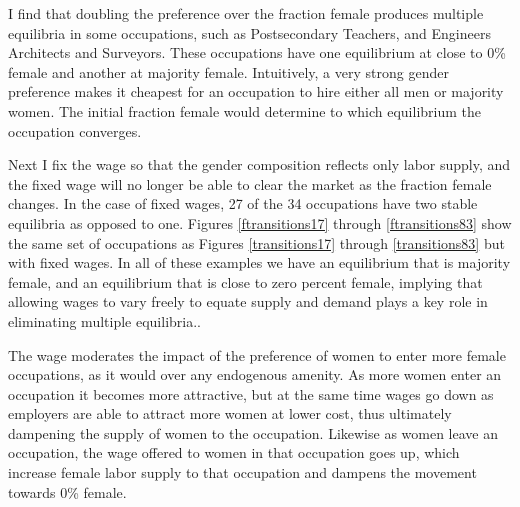 \documentclass[12pt]{article}
\begin{document}

I find that doubling the preference over the fraction female produces multiple equilibria in some occupations, such as Postsecondary Teachers, and Engineers Architects and Surveyors. These occupations have one equilibrium at close to 0\% female and another at majority female. Intuitively, a very strong gender preference makes it cheapest for an occupation to hire either all men or majority women. The initial fraction female would determine to which equilibrium the occupation converges. 


Next I fix the wage so that the gender composition reflects only labor supply, and the fixed wage will no longer be able to clear the market as the fraction female changes. In the case of fixed wages, 27 of the 34 occupations have two stable equilibria as opposed to one. Figures \ref{ftransitions17} through \ref{ftransitions83} show the same set of occupations as Figures \ref{transitions17} through \ref{transitions83} but with fixed wages. In all of these examples we have an equilibrium that is majority female, and an equilibrium that is close to zero percent female, implying that allowing wages to vary freely to equate supply and demand plays a key role in eliminating multiple equilibria..

The wage moderates the impact of the preference of women to enter more female occupations, as it would over any endogenous amenity. As more women enter an occupation it becomes more attractive, but at the same time wages go down as employers are able to attract more women at lower cost, thus ultimately dampening the supply of women to the occupation. Likewise as women leave an occupation, the wage offered to women in that occupation goes up, which increase female labor supply to that occupation and dampens the movement towards 0\% female.


\end{document}
